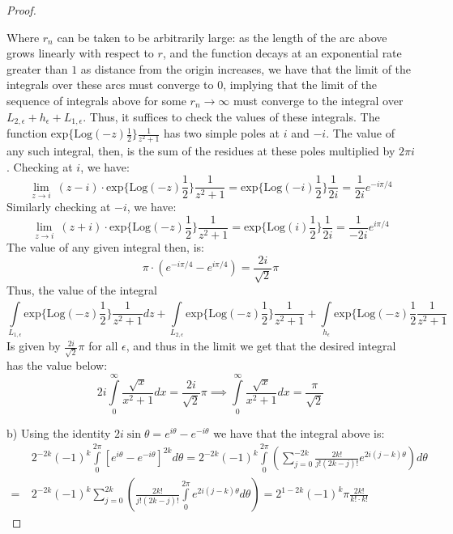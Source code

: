 \documentclass{article}
\begin{document}
\begin{proof}
\begin{center}
\begin{tikzpicture}[x=0.75pt,y=0.75pt,yscale=-0.7,xscale=0.7]
\end{tikzpicture}
\end{center}
Where $r_{n}$ can be taken to be arbitrarily large: as the length of the arc above grows linearly with respect to $r$, and the function decays at an exponential rate greater than $1$ as distance from the origin increases, we have that the limit of the integrals over these arcs must converge to $0$, implying that the limit of the sequence of integrals above for some $r_{n} \to \infty$ must converge to the integral over $L_{2,\epsilon} + h_{\epsilon} + L_{1,\epsilon}$. Thus, it suffices to check the values of these integrals. The function $\text{exp\{Log}(-z)\frac{1}{2}\}\frac{1}{z^{2}+1}$ has two simple poles at $i$ and $-i$. The value of any such integral, then, is the sum of the residues at these poles multiplied by $2\pi i$. Checking at $i$, we have:
\[
  \lim_{z \to i} \ (z-i) \cdot \text{exp\{Log}(-z)\frac{1}{2}\}\frac{1}{z^{2}+1} = \text{exp\{Log}(-i)\frac{1}{2}\}\frac{1}{2i} = \frac{1}{2i}e^{-i\pi/4}
\]
Similarly checking at $-i$, we have:
\[
  \lim_{z \to i} \ (z+i) \cdot \text{exp\{Log}(-z)\frac{1}{2}\}\frac{1}{z^{2}+1} = \text{exp\{Log}(i)\frac{1}{2}\}\frac{1}{2i} = \frac{1}{-2i}e^{i\pi/4}
\]
The value of any given integral then, is:
\[
  \pi \cdot (e^{-i\pi/4}- e^{i\pi/4}) = \frac{2i}{\sqrt{2}} \pi
\]
Thus, the value of the integral
\[
  \int\limits_{L_{1,\epsilon}}^{}\text{exp\{Log}(-z)\frac{1}{2}\}\frac{1}{z^{2}+1}dz + \int\limits_{L_{2,\epsilon}}^{}\text{exp\{Log}(-z)\frac{1}{2}\}\frac{1}{z^{2}+1} + \int\limits_{h_{\epsilon}}^{}\text{exp\{Log}(-z)\frac{1}{2}\frac{1}{z^{2}+1} 
\]
Is given by $\frac{2i}{\sqrt{2}} \pi$ for all $\epsilon$, and thus in the limit we get that the desired integral has the value below:
\[
  2i \int\limits_{0}^{\infty}\frac{\sqrt{x}}{x^{2}+1} dx = \frac{2i}{\sqrt{2}}\pi \implies \int\limits_{0}^{\infty}\frac{\sqrt{x}}{x^{2}+1} dx = \frac{\pi}{\sqrt{2}}
\]

b) Using the identity $2 i \sin \theta =  e^{i\theta} - e^{-i\theta}$ we have that the integral above is:
\begin{align*}
 & 2^{-2k}(-1)^{k}\int\limits_{0}^{2\pi}[e^{i\theta} - e^{-i\theta}]^{2k} d\theta = 2^{-2k}(-1)^{k} \int\limits_{0}^{2\pi}\left(\sum_{j=0}^{-2k}\frac{2k!}{j! (2k-j)!}e^{2i(j-k)\theta}\right) d\theta \\
= \ & 2^{-2k}(-1)^{k} \sum_{j=0}^{2k}\left(\frac{2k!}{j! (2k-j)!} \int\limits_{0}^{2\pi}e^{2i(j-k)\theta}d\theta\right) = 2^{1-2k}(-1)^{k}\pi \frac{2k!}{k! \cdot k!}
  \end{align*}
\end{proof}
\end{document}
